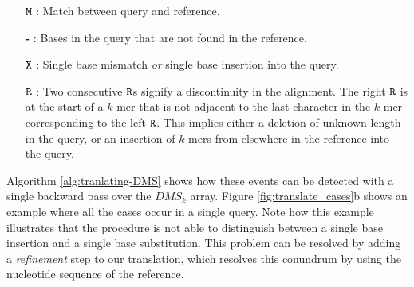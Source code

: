 \documentclass[unnumsec,webpdf,contemporary,large]{oup-authoring-template}%
\theoremstyle{thmstyleone}%
\theoremstyle{thmstyletwo}%
\theoremstyle{thmstylethree}%
\begin{document}

\begin{enumerate}
\item[\textbf{$\tt{M}$}]: Match between query and reference.
\item[\textbf{-}]: Bases in the query that are not found in the reference.
\item[\textbf{$\tt{X}$}]: Single base mismatch \textit{or} single base insertion into the query.
\item[\textbf{$\tt{R}$}]: Two consecutive ${\tt R}$s signify a discontinuity in the alignment. The right ${\tt R}$ is at the start of a $k$-mer that is not adjacent to the last character in the $k$-mer corresponding to the left ${\tt R}$. This implies either a deletion of unknown length in the query, or an insertion of $k$-mers from elsewhere in the reference into the query.
\end{enumerate}
Algorithm \ref{alg:tranlating-DMS} shows how these events can be detected with a single backward pass over the $DMS_k$ array. Figure \ref{fig:translate_cases}b shows an example where all the cases occur in a single query. Note how this example illustrates that the procedure is not able to distinguish between a single base insertion and a single base substitution. This problem can be resolved by adding a \textit{refinement} step to our translation, which resolves this conundrum by using the nucleotide sequence of the reference.
\end{document}
